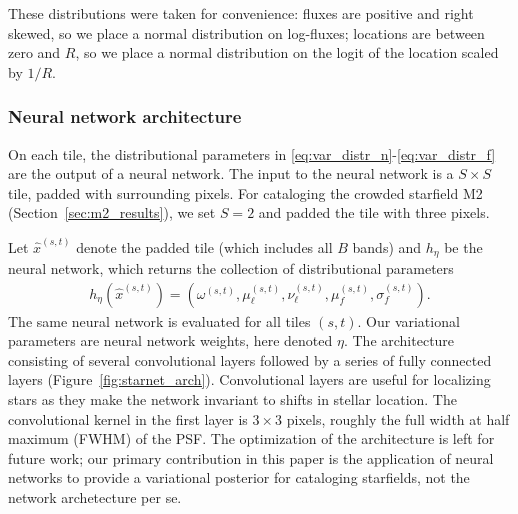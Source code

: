 These distributions were taken for convenience: fluxes are positive and right skewed, so we place a normal distribution on log-fluxes; locations are between zero and $R$, so 
we place a normal distribution on the logit of the location scaled by $1 / R$. 

\subsubsection{Neural network architecture}
\label{sec:nn_archetecture}
On each tile, the distributional parameters 
in \eqref{eq:var_distr_n}-\eqref{eq:var_distr_f} are the output of a neural network.
The input to the neural network is a $S \times S$ tile, padded with surrounding pixels.
For cataloging the crowded starfield M2 (Section~\ref{sec:m2_results}),
we set $S = 2$ and padded the tile with three pixels.

Let $\hat x^{(s,t)}$ denote the padded tile (which includes all $B$ bands) and $h_\eta$ be the neural network, which returns the collection of distributional parameters
\begin{align}
    h_\eta(\hat x^{(s,t)}) = (\omega^{(s,t)}, \mu_\ell^{(s,t)}, \nu_{\ell}^{(s,t)}, \mu_f^{(s,t)}, \sigma^{(s,t)}_f).
    \label{eq:nn_output}
\end{align}
The same neural network is evaluated for all tiles $(s,t)$. Our variational parameters are neural network weights, here denoted $\eta$. 
The architecture consisting of several convolutional layers followed by a series of fully connected layers (Figure~\ref{fig:starnet_arch}). Convolutional layers are useful for localizing stars as they make the network invariant to shifts in stellar location. The convolutional kernel in the first layer is $3\times3$ pixels, roughly the full width at half maximum (FWHM) of the PSF. The optimization of the architecture is left for future work; our primary contribution in this paper is the application of neural networks to provide a variational posterior for cataloging starfields, not the network archetecture per se. 

